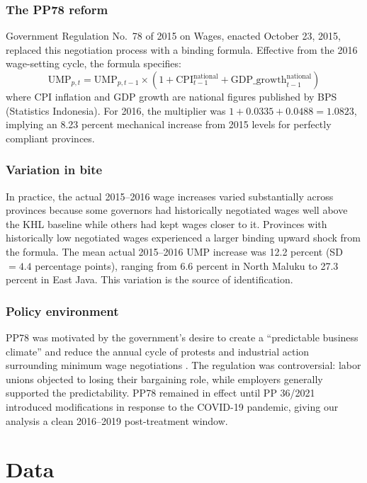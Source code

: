 \documentclass[12pt]{article}
\begin{document}
\subsubsection*{The PP78 reform} Government Regulation No.\ 78 of 2015 on Wages, enacted October 23, 2015, replaced this negotiation process with a binding formula. Effective from the 2016 wage-setting cycle, the formula specifies:
\begin{equation}
\text{UMP}_{p,t} = \text{UMP}_{p,t-1} \times \left(1 + \text{CPI}_{t-1}^{\text{national}} + \text{GDP\_growth}_{t-1}^{\text{national}}\right)
\label{eq:formula}
\end{equation}
where CPI inflation and GDP growth are national figures published by BPS (Statistics Indonesia). For 2016, the multiplier was $1 + 0.0335 + 0.0488 = 1.0823$, implying an 8.23 percent mechanical increase from 2015 levels for perfectly compliant provinces.

\subsubsection*{Variation in bite} In practice, the actual 2015--2016 wage increases varied substantially across provinces because some governors had historically negotiated wages well above the KHL baseline while others had kept wages closer to it. Provinces with historically low negotiated wages experienced a larger binding upward shock from the formula. The mean actual 2015--2016 UMP increase was 12.2 percent (SD $= 4.4$ percentage points), ranging from 6.6 percent in North Maluku to 27.3 percent in East Java. This variation is the source of identification.

\subsubsection*{Policy environment} PP78 was motivated by the government's desire to create a ``predictable business climate'' and reduce the annual cycle of protests and industrial action surrounding minimum wage negotiations \citep{world2015indonesia}. The regulation was controversial: labor unions objected to losing their bargaining role, while employers generally supported the predictability. PP78 remained in effect until PP 36/2021 introduced modifications in response to the COVID-19 pandemic, giving our analysis a clean 2016--2019 post-treatment window.


\section{Data}
\label{sec:data}
\end{document}
